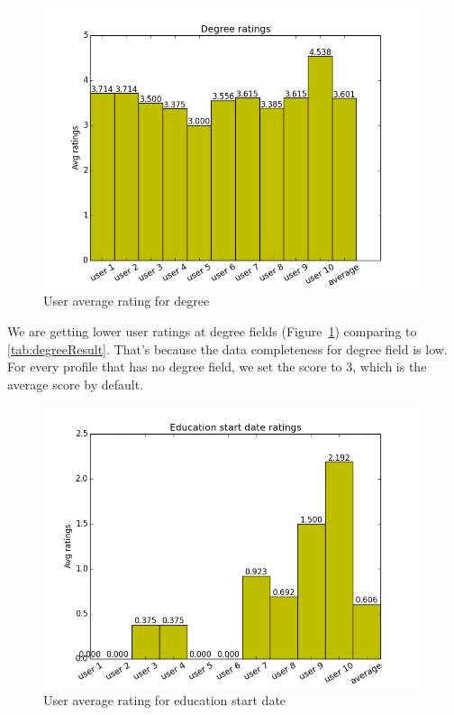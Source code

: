 \begin{figure}[H]
\centering
\includegraphics[width=110mm]{images/evaluation/average_degree_score.png}
\caption{User average rating for degree}
\label{fig:degree}
\end{figure}

We are getting lower user ratings at degree fields (Figure~\ref{fig:degree}) comparing to \autoref{tab:degreeResult}. That's because the data completeness for degree field is low. For every profile that has no degree field, we set the score to 3, which is the average score by default.

\begin{figure}[H]
\centering
\includegraphics[width=110mm]{images/evaluation/average_education_start_date_score.png}
\caption{User average rating for education start date}
\label{fig:educationstart}
\end{figure}


